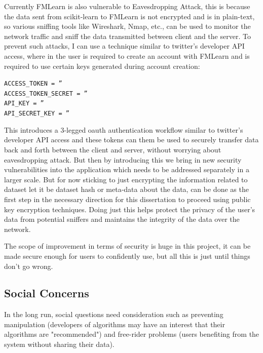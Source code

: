 Currently FMLearn is also vulnerable to Eavesdropping Attack, this is because the data sent from scikit-learn to FMLearn is not encrypted and is in plain-text, so various sniffing tools like Wireshark, Nmap, etc., can be used to monitor the network traffic and sniff the data transmitted between client and the server. To prevent such attacks, I can use a technique similar to twitter’s developer API access, where in the user is required to create an account with FMLearn and is required to use certain keys generated during account creation:

\begin{center}
\texttt{ACCESS\_TOKEN = ''\\}
\texttt{ACCESS\_TOKEN\_SECRET = ''\\}
\texttt{API\_KEY = ''\\}
\texttt{API\_SECRET\_KEY = ''}
\end{center}

This introduces a 3-legged oauth authentication workflow similar to twitter’s developer API \citep{twitter-oauth} access and these tokens can them be used to securely transfer data back and forth between the client and server, without worrying about eavesdropping attack. But then by introducing this we bring in new security vulnerabilities into the application which needs to be addressed separately in a larger scale. But for now sticking to just encrypting the information related to dataset let it be dataset hash or meta-data about the data, can be done as the first step in the necessary direction for this dissertation to proceed using public key encryption techniques. Doing just this helps protect the privacy of the user’s data from potential sniffers and maintains the integrity of the data over the network.

The scope of improvement in terms of security is huge in this project, it can be made secure enough for users to confidently use, but all this is just until things don’t go wrong.

\subsection{Social Concerns}
In the long run, social questions need consideration such as preventing manipulation (developers of algorithms may have an interest that their algorithms are "recommended") and free-rider problems (users benefiting from the system without sharing their data).

